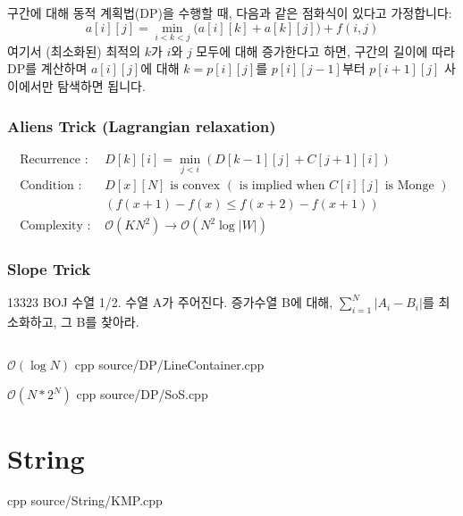 \documentclass[landscape, 8pt, a4paper, oneside]{extarticle}
\begin{document}
\begin{multicols}{3}
구간에 대해 동적 계획법(DP)을 수행할 때, 다음과 같은 점화식이 있다고 가정합니다:
\[ a[i][j] = \min_{i < k < j} \big( a[i][k] + a[k][j] \big) + f(i, j) \]
여기서 (최소화된) 최적의 \( k \)가 \( i \)와 \( j \) 모두에 대해 증가한다고 하면, 구간의 길이에 따라 DP를 계산하며 \( a[i][j] \)에 대해 \( k = p[i][j] \)를 \( p[i][j-1] \)부터 \( p[i+1][j] \) 사이에서만 탐색하면 됩니다.

\subsubsection{Aliens Trick (Lagrangian relaxation)}
\begin{align*}
    \text{ Recurrence : }& D[k][i] = \min_{j<i} \left( D[k-1][j] + C[j+1][i]\right)\\
    \text{ Condition : }& D[x][N] \text{ is convex } ( \text{ is implied when } C[i][j] \text{ is Monge } ) \\
    & \left( f(x+1)-f(x) \leqslant  f(x+2)-f(x+1)  \right)\\
    \text{ Complexity : }& \mathcal O(KN^2) \rightarrow \mathcal O(N^2 \log |W|)
\end{align*}
\subsubsection{Slope Trick}
13323 BOJ 수열 1/2. 수열 A가 주어진다. 증가수열 B에 대해, $\sum_{i=1}^N |A_i - B_i|$를 최소화하고, 그 B를 찾아라.
\inputminted[]{cpp}{source/DP/SlopeTrick.cpp}

{}
{$\mathcal O(\log N)$}
{cpp}
{source/DP/LineContainer.cpp}

{}
{$\mathcal O(N*2^N)$}
{cpp}
{source/DP/SoS.cpp}


\section{String}


{}
{}
{cpp}
{source/String/KMP.cpp}


\end{multicols}
\end{document}
